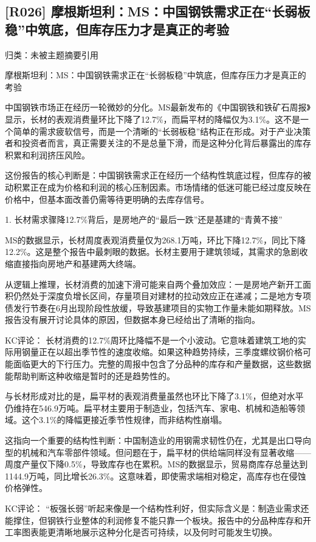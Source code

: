 \documentclass[11pt]{ctexart}
\begin{document}
\subsection{[R026] 摩根斯坦利：MS：中国钢铁需求正在“长弱板稳”中筑底，但库存压力才是真正的考验}
{\small\color{refgray}归类：未被主题摘要引用}

摩根斯坦利：MS：中国钢铁需求正在“长弱板稳”中筑底，但库存压力才是真正的考验

中国钢铁市场正在经历一轮微妙的分化。MS最新发布的《中国钢铁和铁矿石周报》显示，长材的表观消费量环比下降了12.7\%，而扁平材的降幅仅为3.1\%。这不是一个简单的需求疲软信号，而是一个清晰的“长弱板稳”结构正在形成。对于产业决策者和投资者而言，真正需要关注的不是总量下滑，而是这种分化背后暴露出的库存积累和利润挤压风险。

这份报告的核心判断是：中国钢铁需求正在经历一个结构性筑底过程，但库存的被动积累正在成为价格和利润的核心压制因素。市场情绪的低迷可能已经过度反映在价格中，但基本面改善仍需等待更明确的去库存信号。

1. 长材需求骤降12.7\%背后，是房地产的“最后一跌”还是基建的“青黄不接”

MS的数据显示，长材周度表观消费量仅为268.1万吨，环比下降12.7\%，同比下降12.2\%。这是整个报告中最刺眼的数据。长材主要用于建筑领域，其需求的急剧收缩直接指向房地产和基建两大终端。

从逻辑上推理，长材消费的加速下滑可能来自两个叠加效应：一是房地产新开工面积仍然处于深度负增长区间，存量项目对建材的拉动效应正在递减；二是地方专项债发行节奏在6月出现阶段性放缓，导致基建项目的实物工作量未能如期释放。MS报告没有展开讨论具体的原因，但数据本身已经给出了清晰的指向。

KC评论： 长材消费的12.7\%周环比降幅不是一个小波动。它意味着建筑工地的实际用钢量正在以超出季节性的速度收缩。如果这种趋势持续，三季度螺纹钢价格可能面临更大的下行压力。完整的周报中包含了分品种的库存和产量数据，这些数据能帮助判断这种收缩是暂时的还是趋势性的。

与长材形成对比的是，扁平材的表观消费量虽然也环比下降了3.1\%，但绝对水平仍维持在546.9万吨。扁平材主要用于制造业，包括汽车、家电、机械和造船等领域。这个3.1\%的降幅更接近季节性规律，而非结构性崩塌。

这指向一个重要的结构性判断：中国制造业的用钢需求韧性仍在，尤其是出口导向型的机械和汽车零部件领域。但问题在于，扁平材的供给端同样没有显著收缩——周度产量仅下降0.5\%，导致库存也在累积。MS的数据显示，贸易商库存总量达到1144.9万吨，同比增长26.3\%。这意味着，即使需求端相对稳定，高库存也在侵蚀价格弹性。

KC评论： “板强长弱”听起来像是一个结构性利好，但实际含义是：制造业需求还能撑住，但钢铁行业整体的利润修复不能只靠一个板块。报告中的分品种库存和开工率图表能更清晰地展示这种分化是否可持续，以及何时可能发生切换。
\end{document}
